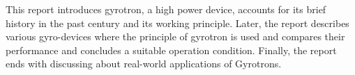 This report introduces gyrotron, a high power device, accounts for its brief history in the past century and its working principle. Later, the report describes various gyro-devices where the principle of gyrotron is used and compares their performance and concludes a suitable operation condition. Finally, the report ends with discussing about real-world applications of Gyrotrons.